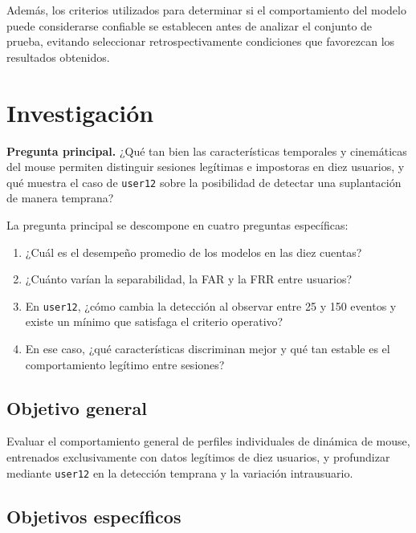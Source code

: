 \documentclass[11pt,letterpaper]{article}
\begin{document}
Además, los criterios utilizados para determinar si el comportamiento del modelo puede considerarse confiable
se establecen antes de analizar el conjunto de prueba, evitando seleccionar retrospectivamente condiciones que
favorezcan los resultados obtenidos.


\section{Investigación}

\textbf{Pregunta principal.} ¿Qué tan bien las características temporales y cinemáticas del mouse permiten
distinguir sesiones legítimas e impostoras en diez usuarios, y qué muestra el caso de \texttt{user12} sobre
la posibilidad de detectar una suplantación de manera temprana?


La pregunta principal se descompone en cuatro preguntas específicas:

\begin{enumerate}
  \item ¿Cuál es el desempeño promedio de los modelos en las diez cuentas?
  \item ¿Cuánto varían la separabilidad, la FAR y la FRR entre usuarios?
  \item En \texttt{user12}, ¿cómo cambia la detección al observar entre 25 y 150 eventos y existe un mínimo que
  satisfaga el criterio operativo?
  \item En ese caso, ¿qué características discriminan mejor y qué tan estable es el comportamiento legítimo entre
  sesiones?
\end{enumerate}

\subsection{Objetivo general}

Evaluar el comportamiento general de perfiles individuales de dinámica de mouse, entrenados exclusivamente con datos
legítimos de diez usuarios, y profundizar mediante \texttt{user12} en la detección temprana y la variación
intrausuario.

\subsection{Objetivos específicos}
\end{document}
